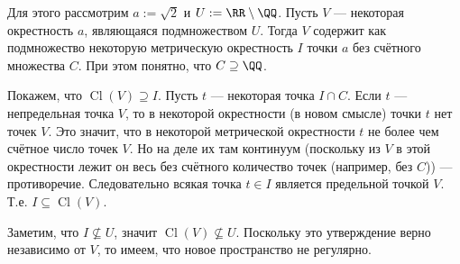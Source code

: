 \documentclass[12pt,a4paper]{article}
\DeclareMathOperator{\Cl}{Cl}
\begin{document}
\begin{problem}{48}
\begin{itemize}
            Для этого рассмотрим $a := \sqrt{2}$ и $U := \RR \setminus \QQ$. Пусть $V$ --- некоторая окрестность $a$, являющаяся подмножеством $U$. Тогда $V$ содержит как подмножество некоторую метрическую окрестность $I$ точки $a$ без счётного множества $C$. При этом понятно, что $C \supseteq \QQ$.
            
            Покажем, что $\Cl(V) \supseteq I$. Пусть $t$ --- некоторая точка $I \cap C$. Если $t$ --- непредельная точка $V$, то в некоторой окрестности (в новом смысле) точки $t$ нет точек $V$. Это значит, что в некоторой метрической окрестности $t$ не более чем счётное число точек $V$. Но на деле их там континуум (поскольку из $V$ в этой окрестности лежит он весь без счётного количество точек (например, без $C$)) --- противоречие. Следовательно всякая точка $t \in I$ является предельной точкой $V$. Т.е. $I \subseteq \Cl(V)$.

            Заметим, что $I \nsubseteq U$, значит $\Cl(V) \nsubseteq U$. Поскольку это утверждение верно независимо от $V$, то имеем, что новое пространство не регулярно.
        \end{itemize}
    \end{problem}
\end{document}
